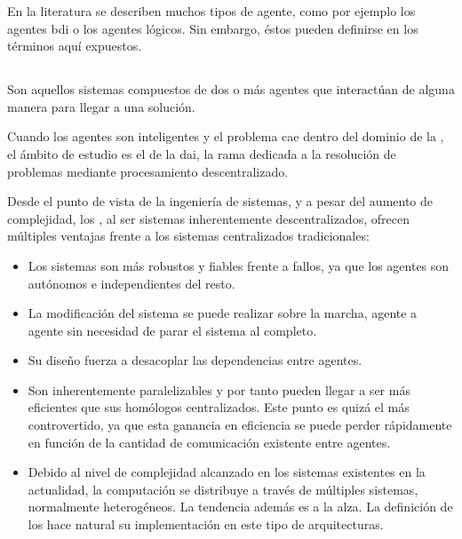 En la literatura se describen muchos tipos de agente, como por ejemplo los agentes \Acrfull{bdi} o los agentes lógicos. Sin embargo, éstos pueden definirse en los términos aquí expuestos. 

\subsection{}

Son aquellos sistemas compuestos de dos o más agentes que interactúan de alguna manera para llegar a una solución.

Cuando los agentes son inteligentes y el problema cae dentro del dominio de la , el ámbito de estudio es el de la \gls{dai}, la rama dedicada a la resolución de problemas mediante procesamiento descentralizado.

Desde el punto de vista de la ingeniería de sistemas, y a pesar del aumento de complejidad, los , al ser sistemas inherentemente descentralizados, ofrecen múltiples ventajas frente a los sistemas centralizados tradicionales:

\begin{itemize}
	\item Los sistemas son más robustos y fiables frente a fallos, ya que los agentes son autónomos e independientes del resto.
	\item La modificación del sistema se puede realizar sobre la marcha, agente a agente sin necesidad de parar el sistema al completo.
	\item Su diseño fuerza a desacoplar las dependencias entre agentes.
	\item Son inherentemente paralelizables y por tanto pueden llegar a ser más eficientes que sus homólogos centralizados. Este punto es quizá el más controvertido, ya que esta ganancia en eficiencia se puede perder rápidamente en función de la cantidad de comunicación existente entre agentes.
	\item Debido al nivel de complejidad alcanzado en los sistemas existentes en la actualidad, la computación se distribuye a través de múltiples sistemas, normalmente heterogéneos. La tendencia además es a la alza. La definición de los  hace natural su implementación en este tipo de arquitecturas.
\end{itemize}

